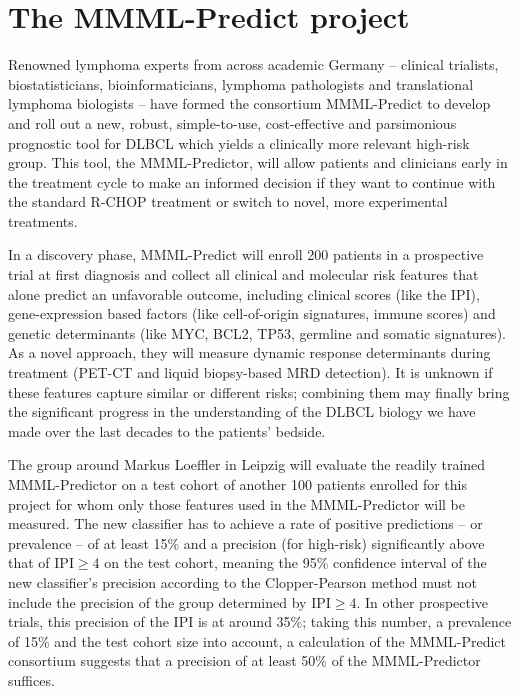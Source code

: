 \section{The MMML-Predict project}

Renowned lymphoma experts from across academic Germany -- clinical trialists, biostatisticians, 
bioinformaticians, lymphoma pathologists and translational lymphoma biologists -- have formed the 
consortium MMML-Predict to develop and roll out a new, robust, simple-to-use, cost-effective and 
parsimonious prognostic tool for DLBCL 
which yields a clinically more relevant high-risk group. This tool, the MMML-Predictor, will allow 
patients and clinicians early in the treatment cycle to make an informed decision if they want to 
continue with the standard R-CHOP treatment or switch to novel, more experimental treatments. 

In a discovery phase, MMML-Predict will enroll 200 patients in a prospective trial at first diagnosis and 
collect all clinical and molecular risk features that alone predict an unfavorable outcome, 
including clinical scores (like the IPI), gene-expression based factors (like cell-of-origin signatures,
immune scores) and genetic determinants (like MYC, BCL2, TP53, germline and somatic signatures).
As a novel approach, they will measure dynamic response determinants during treatment (PET-CT 
and liquid biopsy-based MRD detection). It is unknown if these features capture similar or different 
risks; combining them may finally bring the significant progress in the understanding of the DLBCL 
biology we have made over the last decades to the patients' bedside.

The group around Markus Loeffler in Leipzig will evaluate the readily trained MMML-Predictor on a 
test cohort of another 100 patients enrolled for this project for whom only those features used 
in the MMML-Predictor will be measured. The new classifier has to achieve a rate of positive 
predictions -- or prevalence -- of at least \num{15}\% and a precision (for high-risk) significantly above that of 
$\text{IPI} \geq 4$ on the test cohort, meaning the \num{95}\% confidence interval of the new 
classifier's precision according to the Clopper-Pearson method must not include the precision of 
the group determined by $\text{IPI} \geq 4$. In other prospective trials, this precision of the IPI 
is at around \num{35}\%; taking this number, a prevalence of \num{15}\% and the test cohort size into 
account, a calculation of the MMML-Predict consortium suggests that a precision of at least \num{50}\%
of the MMML-Predictor suffices.

